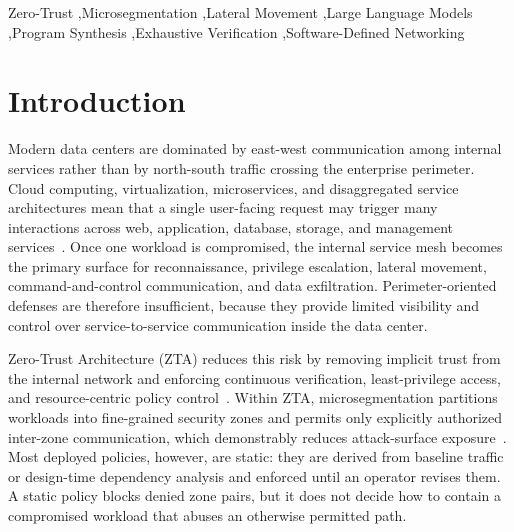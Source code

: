 \documentclass[final,5p]{elsarticle}
\begin{document}
\begin{frontmatter}

\begin{keyword}
Zero-Trust \sep Microsegmentation \sep Lateral Movement \sep Large Language Models \sep Program Synthesis \sep Exhaustive Verification \sep Software-Defined Networking
\end{keyword}

\end{frontmatter}

\section{Introduction}
\label{sec:introduction}

Modern data centers are dominated by east-west communication among internal services rather than by north-south traffic crossing the enterprise perimeter. Cloud computing, virtualization, microservices, and disaggregated service architectures mean that a single user-facing request may trigger many interactions across web, application, database, storage, and management services~\cite{nielsen2017flipping}. Once one workload is compromised, the internal service mesh becomes the primary surface for reconnaissance, privilege escalation, lateral movement, command-and-control communication, and data exfiltration. Perimeter-oriented defenses are therefore insufficient, because they provide limited visibility and control over service-to-service communication inside the data center.

Zero-Trust Architecture (ZTA) reduces this risk by removing implicit trust from the internal network and enforcing continuous verification, least-privilege access, and resource-centric policy control~\cite{ward2014beyondcorp,rose2020zerotrust}. Within ZTA, microsegmentation partitions workloads into fine-grained security zones and permits only explicitly authorized inter-zone communication, which demonstrably reduces attack-surface exposure~\cite{basta2022towards,buck2021nevertrust,syed2022ztasurvey,chandramouli2023zta207a,chandramouli2020sp800204a}. Most deployed policies, however, are static: they are derived from baseline traffic or design-time dependency analysis and enforced until an operator revises them. A static policy blocks denied zone pairs, but it does not decide how to contain a compromised workload that abuses an otherwise permitted path.
\end{document}
